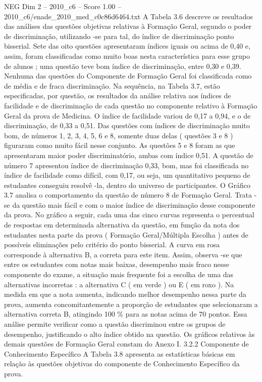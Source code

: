\begin{textsample}{NEG Dim 2 – 2010\_c6 – Score 1.00 – 2010\_c6/enade\_2010\_med\_c0c86d6464.txt}
A Tabela 3.6 descreve os resultados das análises das questões objetivas relativas à Formação Geral, segundo o poder de discriminação, utilizando -se para tal, do índice de discriminação ponto bisserial.
Sete das oito questões apresentaram índices iguais ou acima de 0,40 e, assim, foram classificadas como muito boas nesta característica para esse grupo de alunos ; uma questão teve bom índice de discriminação, entre 0,30 e 0,39.
Nenhuma das questões do Componente de Formação Geral foi classificada como de média e de fraca discriminação.
Na sequência, na Tabela 3.7, estão especificadas, por questão, os resultados da análise relativa aos índices de facilidade e de discriminação de cada questão no componente relativo à Formação Geral da prova de Medicina.
O índice de facilidade variou de 0,17 a 0,94, e o de discriminação, de 0,33 a 0,51.
Das questões com índices de discriminação muito bom, de números 1, 2, 3, 4, 5, 6 e 8, somente duas delas ( questões 3 e 8 ) figuraram como muito fácil nesse conjunto.
As questões 5 e 8 foram as que apresentaram maior poder discriminatório, ambas com índice 0,51.
A questão de número 7 apresentou índice de discriminação 0,33, bom, mas foi classificada no índice de facilidade como difícil, com 0,17, ou seja, um quantitativo pequeno de estudantes conseguiu resolvê -la, dentro do universo de participantes.
O Gráfico 3.7 analisa o comportamento da questão de número 8 de Formação Geral.
Trata -se da questão mais fácil e com o maior índice de discriminação desse componente da prova.
No gráfico a seguir, cada uma das cinco curvas representa o percentual de respostas em determinada alternativa da questão, em função da nota dos estudantes nesta parte da prova ( Formação Geral/Múltipla Escolha ) antes de possíveis eliminações pelo critério do ponto bisserial.
A curva em rosa corresponde à alternativa B, a correta para este item.
Assim, observa -se que entre os estudantes com notas mais baixas, desempenho mais fraco nesse componente do exame, a situação mais frequente foi a escolha de uma das alternativas incorretas : a alternativa C ( em verde ) ou E ( em roxo ).
Na medida em que a nota aumenta, indicando melhor desempenho nessa parte da prova, aumenta concomitantemente a proporção de estudantes que selecionaram a alternativa correta B, atingindo 100 \% para as notas acima de 70 pontos.
Essa análise permite verificar como a questão discriminou entre os grupos de desempenho, justificando o alto índice obtido na questão.
Os gráficos relativos às demais questões de Formação Geral constam do Anexo I. 3.2.2 Componente de Conhecimento Específico A Tabela 3.8 apresenta as estatísticas básicas em relação às questões objetivas do componente de Conhecimento Específico da prova.

\end{textsample}
